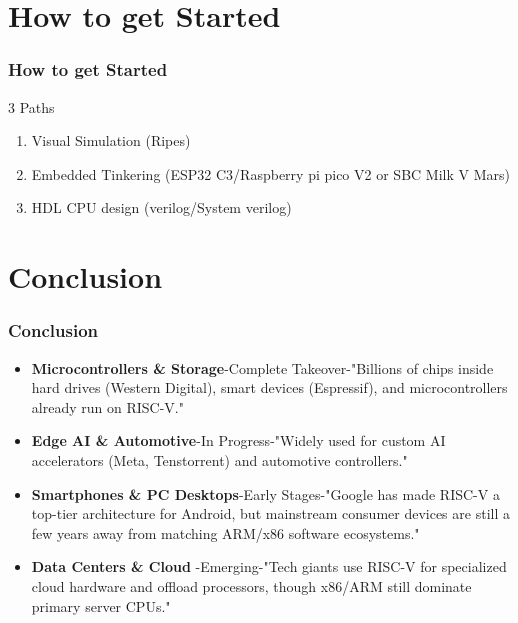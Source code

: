\documentclass{beamer}
\begin{document}
\section{How to get Started}
\begin{frame}
\frametitle{How to get Started}
3 Paths
\begin{enumerate}
 \item Visual Simulation (Ripes)
 \item Embedded Tinkering (ESP32 C3/Raspberry pi pico V2 or SBC Milk V Mars)
 \item HDL CPU design (verilog/System verilog)

\end{enumerate}

\end{frame}

\section{Conclusion}
\begin{frame}[plain]
\frametitle{Conclusion}
\begin{itemize}
 \item \textbf{Microcontrollers \& Storage}-Complete Takeover-"Billions of chips inside hard drives (Western Digital), smart devices (Espressif), and microcontrollers already run on RISC-V."
 \item \textbf{Edge AI \& Automotive}-In Progress-"Widely used for custom AI accelerators (Meta, Tenstorrent) and automotive controllers."
 \item \textbf{Smartphones \& PC Desktops}-Early Stages-"Google has made RISC-V a top-tier architecture for Android, but mainstream consumer devices are still a few years away from matching ARM/x86 software ecosystems."
 \item \textbf{Data Centers \& Cloud }-Emerging-"Tech giants use RISC-V for specialized cloud hardware and offload processors, though x86/ARM still dominate primary server CPUs."
\end{itemize}
\end{frame}
\end{document}
